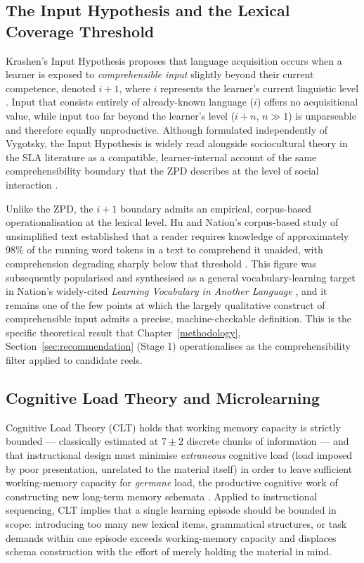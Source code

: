     \subsection{The Input Hypothesis and the Lexical Coverage Threshold}
    \label{subsec:comprehensible_input}
    Krashen's Input Hypothesis proposes that language acquisition occurs when a learner is exposed to \emph{comprehensible input} slightly beyond their current competence, denoted $i+1$, where $i$ represents the learner's current linguistic level \cite{krashen1985input}. Input that consists entirely of already-known language ($i$) offers no acquisitional value, while input too far beyond the learner's level ($i+n$, $n \gg 1$) is unparseable and therefore equally unproductive. Although formulated independently of Vygotsky, the Input Hypothesis is widely read alongside sociocultural theory in the SLA literature as a compatible, learner-internal account of the same comprehensibility boundary that the ZPD describes at the level of social interaction \cite{lantolf2000sociocultural}.

    Unlike the ZPD, the $i+1$ boundary admits an empirical, corpus-based operationalisation at the lexical level. Hu and Nation's corpus-based study of unsimplified text established that a reader requires knowledge of approximately 98\% of the running word tokens in a text to comprehend it unaided, with comprehension degrading sharply below that threshold \cite{hunation2000}. This figure was subsequently popularised and synthesised as a general vocabulary-learning target in Nation's widely-cited \textit{Learning Vocabulary in Another Language} \cite{nation2001learning}, and it remains one of the few points at which the largely qualitative construct of comprehensible input admits a precise, machine-checkable definition. This is the specific theoretical result that Chapter~\ref{methodology}, Section~\ref{sec:recommendation} (Stage 1) operationalises as the comprehensibility filter applied to candidate reels.

    \subsection{Cognitive Load Theory and Microlearning}
    \label{subsec:cognitive_load_microlearning}
    Cognitive Load Theory (CLT) holds that working memory capacity is strictly bounded --- classically estimated at $7 \pm 2$ discrete chunks of information \cite{miller1956magical} --- and that instructional design must minimise \emph{extraneous} cognitive load (load imposed by poor presentation, unrelated to the material itself) in order to leave sufficient working-memory capacity for \emph{germane} load, the productive cognitive work of constructing new long-term memory schemata \cite{sweller1988cognitive}. Applied to instructional sequencing, CLT implies that a single learning episode should be bounded in scope: introducing too many new lexical items, grammatical structures, or task demands within one episode exceeds working-memory capacity and displaces schema construction with the effort of merely holding the material in mind.


